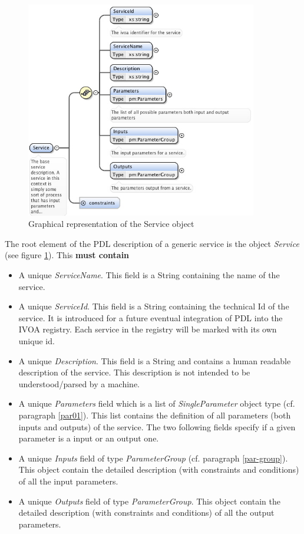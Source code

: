 \documentclass[a4paper,11pt] {ivoa}
\begin{document}
\begin{figure}[htbp]
\begin{center}
\includegraphics[width=0.9\textwidth]{pictures/Service.jpg} 
\caption{Graphical representation of the Service object}
\label{Pic-Service}
\end{center}
\end{figure}

The root element of the PDL description of a generic service is the object {\it Service} (see figure
\ref{Pic-Service}). This {\bf must contain}
\begin{itemize}
\item A unique {\it ServiceName}. This field is a String containing the name of the service.
\item A unique {\it ServiceId}. This field is a String containing the technical Id of the service.
It is introduced for a future eventual integration of PDL into the IVOA registry. Each service in
the registry will be marked with its own unique id.
\item A unique {\it Description}. This field is a String and contains a human readable description
of the service. This description is not intended to be understood/parsed by a machine.
\item A unique {\it Parameters} field which is a list of {\it SingleParameter} object type (cf.
paragraph \ref{par01}). This list contains the definition of all parameters (both inputs and
outputs) of the service. The two following fields specify if a given parameter is a input or an
output one.
\item A unique {\it Inputs} field of type {\it ParameterGroup} (cf. paragraph \ref{par-group}). This
object contain the detailed description (with constraints and conditions) of all the input
parameters.
\item A unique {\it Outputs} field of type {\it ParameterGroup}. This object contain the detailed
description (with constraints and conditions) of all the output parameters.
\end{itemize}
\end{document}
